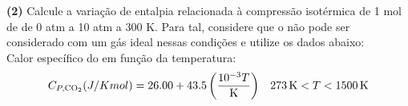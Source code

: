 \textbf{(2)} Calcule a variação de entalpia relacionada à compressão isotérmica
de 1 mol de  de 0 atm a 10 atm a 300 K. Para tal, considere que o
 não pode ser considerado com um gás ideal nessas condições e utilize os
dados abaixo:\\

Calor específico do  em função da temperatura:
\begin{align*}
    C_{P, \ce{CO2}} (J / K mol) = \num{26.00} + \num{43.5} \left(\frac{10^{-3}
    T}{\unit{K}}\right) && \qty{273}{K} < T < \qty{1500}{K}
\end{align*}
